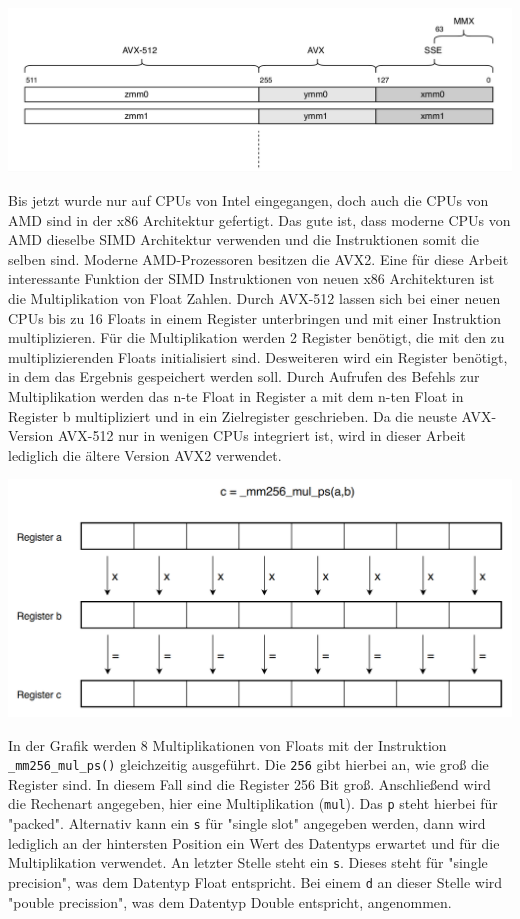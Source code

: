 \documentclass[../main.tex]{subfiles}
\begin{document}
\includegraphics[width=\textwidth]{../images/Benz/simd_avx_sse_mmx.png}

Bis jetzt wurde nur auf CPUs von Intel eingegangen, doch auch die CPUs von AMD sind in der x86 Architektur gefertigt. Das gute ist, dass moderne CPUs von AMD dieselbe SIMD Architektur verwenden und die Instruktionen somit die selben sind. Moderne AMD-Prozessoren besitzen die AVX2.
Eine für diese Arbeit interessante Funktion der SIMD Instruktionen von neuen x86 Architekturen ist die Multiplikation von Float Zahlen. Durch AVX-512 lassen sich bei einer neuen CPUs bis zu 16 Floats in einem Register unterbringen und mit einer Instruktion multiplizieren. Für die Multiplikation werden 2 Register benötigt, die mit den zu multiplizierenden Floats initialisiert sind. Desweiteren wird ein Register benötigt, in dem das Ergebnis gespeichert werden soll. Durch Aufrufen des Befehls zur Multiplikation werden das n-te Float in Register a mit dem n-ten Float in Register b multipliziert und in ein Zielregister geschrieben.
Da die neuste AVX-Version AVX-512 nur in wenigen CPUs integriert ist, wird in dieser Arbeit lediglich die ältere Version AVX2 verwendet.

\includegraphics[width=\textwidth]{../images/Benz/avx.png}

In der Grafik werden 8 Multiplikationen von Floats mit der Instruktion \texttt{\_mm256\_mul\_ps()} gleichzeitig ausgeführt. Die \texttt{256} gibt hierbei an, wie groß die Register sind. In diesem Fall sind die Register 256 Bit groß. Anschließend wird die Rechenart angegeben, hier eine Multiplikation (\texttt{mul}). Das \texttt{p} steht hierbei für "packed". Alternativ kann ein \texttt{s} für "single slot" angegeben werden, dann wird lediglich an der hintersten Position ein Wert des Datentyps erwartet und für die Multiplikation verwendet. An letzter Stelle steht ein \texttt{s}. Dieses steht für "single precision", was dem Datentyp Float entspricht. Bei einem \texttt{d} an dieser Stelle wird "pouble precission", was dem Datentyp Double entspricht, angenommen.
\end{document}
